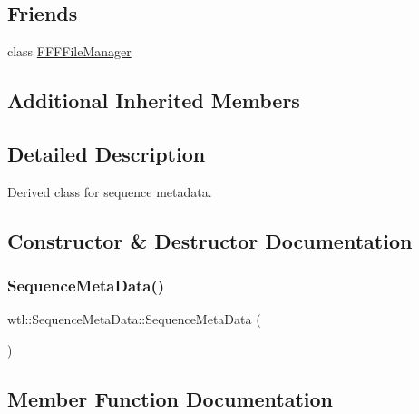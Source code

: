 \subsection*{Friends}
\begin{DoxyCompactItemize}
\item 
class \hyperlink{classwtl_1_1_sequence_meta_data_a89f52b56f7155da8da3c26ad5feb1bcc}{F\+F\+F\+File\+Manager}
\end{DoxyCompactItemize}
\subsection*{Additional Inherited Members}


\subsection{Detailed Description}
Derived class for sequence metadata. 

\subsection{Constructor \& Destructor Documentation}
\mbox{\label{classwtl_1_1_sequence_meta_data_a309c905124f9595f60aa2aff5ac593c1}} 
\subsubsection{\texorpdfstring{Sequence\+Meta\+Data()}{SequenceMetaData()}}
{\footnotesize\ttfamily wtl\+::\+Sequence\+Meta\+Data\+::\+Sequence\+Meta\+Data (\begin{DoxyParamCaption}{ }\end{DoxyParamCaption})}



\subsection{Member Function Documentation}
\mbox{\label{classwtl_1_1_sequence_meta_data_ae2883595f742f14a43447a9d2c7fcc8c}} 
